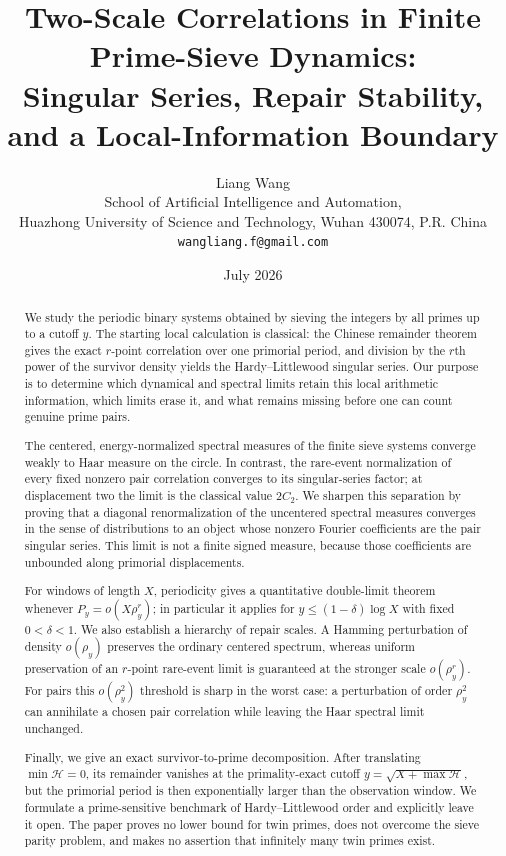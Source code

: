 \documentclass[11pt]{article}
\title{\textbf{Two-Scale Correlations in Finite Prime-Sieve Dynamics:}\\
\textbf{Singular Series, Repair Stability, and a Local-Information Boundary}}
\author{Liang Wang\\
\small School of Artificial Intelligence and Automation,\\[-0.2em]
\small Huazhong University of Science and Technology, Wuhan 430074, P.R. China\\
\small \texttt{wangliang.f@gmail.com}}
\date{July 2026}
\theoremstyle{definition}
\theoremstyle{remark}
\newcommand{\cH}{\mathcal H}
\begin{document}
\maketitle

\begin{abstract}
We study the periodic binary systems obtained by sieving the integers by all primes up to a cutoff $y$.  The starting local calculation is classical: the Chinese remainder theorem gives the exact $r$-point correlation over one primorial period, and division by the $r$th power of the survivor density yields the Hardy--Littlewood singular series.  Our purpose is to determine which dynamical and spectral limits retain this local arithmetic information, which limits erase it, and what remains missing before one can count genuine prime pairs.

The centered, energy-normalized spectral measures of the finite sieve systems converge weakly to Haar measure on the circle.  In contrast, the rare-event normalization of every fixed nonzero pair correlation converges to its singular-series factor; at displacement two the limit is the classical value $2C_2$.  We sharpen this separation by proving that a diagonal renormalization of the uncentered spectral measures converges in the sense of distributions to an object whose nonzero Fourier coefficients are the pair singular series.  This limit is not a finite signed measure, because those coefficients are unbounded along primorial displacements.

For windows of length $X$, periodicity gives a quantitative double-limit theorem whenever $P_y=o(X\rho_y^r)$; in particular it applies for $y\le(1-\delta)\log X$ with fixed $0<\delta<1$.  We also establish a hierarchy of repair scales.  A Hamming perturbation of density $o(\rho_y)$ preserves the ordinary centered spectrum, whereas uniform preservation of an $r$-point rare-event limit is guaranteed at the stronger scale $o(\rho_y^r)$.  For pairs this $o(\rho_y^2)$ threshold is sharp in the worst case: a perturbation of order $\rho_y^2$ can annihilate a chosen pair correlation while leaving the Haar spectral limit unchanged.

Finally, we give an exact survivor-to-prime decomposition.  After translating $\min\cH=0$, its remainder vanishes at the primality-exact cutoff $y=\sqrt{X+\max\cH}$, but the primorial period is then exponentially larger than the observation window.  We formulate a prime-sensitive benchmark of Hardy--Littlewood order and explicitly leave it open.  The paper proves no lower bound for twin primes, does not overcome the sieve parity problem, and makes no assertion that infinitely many twin primes exist.
\end{abstract}
\end{document}
